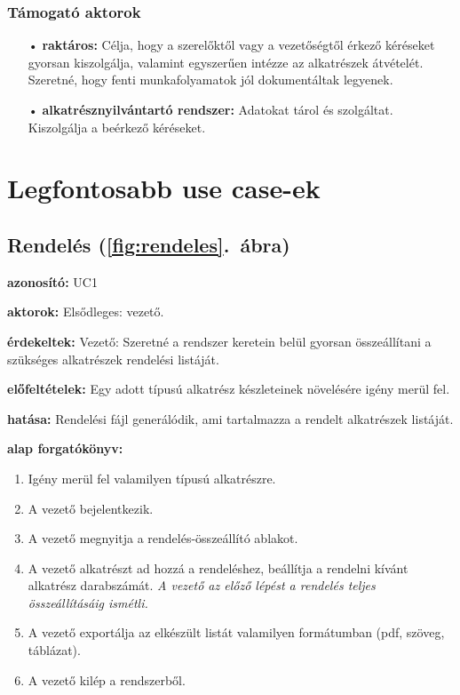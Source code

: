 \documentclass[12pt]{article}\usepackage[left=20mm,right=20mm,top=14mm,bottom=20mm]{geometry}
\begin{document}
\subsubsection{Támogató aktorok}
\begin{itemize}
\item[•] \textbf{raktáros: } Célja, hogy a szerelőktől vagy a vezetőségtől érkező kéréseket gyorsan kiszolgálja, valamint egyszerűen intézze az alkatrészek átvételét.
Szeretné, hogy fenti munkafolyamatok jól dokumentáltak legyenek.

\item[•] \textbf{alkatrésznyilvántartó rendszer: } Adatokat tárol és szolgáltat. Kiszolgálja a beérkező kéréseket.
\end{itemize}

\section{Legfontosabb use case-ek}
\subsection{Rendelés (\ref{fig:rendeles}.~ábra)}
\noindent\textbf{azonosító: } UC1
\vspace{4mm}

\noindent\textbf{aktorok: } Elsődleges: vezető.  
\vspace{4mm}

\noindent\textbf{érdekeltek: } Vezető: Szeretné a rendszer keretein belül gyorsan összeállítani a szükséges alkatrészek rendelési listáját.
\vspace{4mm}

\noindent\textbf{előfeltételek: } Egy adott típusú alkatrész készleteinek növelésére igény merül fel.
\vspace{4mm}

\noindent\textbf{hatása: } Rendelési fájl generálódik, ami tartalmazza a rendelt alkatrészek listáját.
\vspace{4mm}

\noindent\textbf{alap forgatókönyv: }
\begin{enumerate}
\item Igény merül fel valamilyen típusú alkatrészre.
\item A vezető bejelentkezik.
\item A vezető megnyitja a rendelés-összeállító ablakot.
\item A vezető alkatrészt ad hozzá a rendeléshez, beállítja a rendelni kívánt alkatrész darabszámát.
\textit{A vezető az előző lépést a rendelés teljes összeállításáig ismétli.}
\item A vezető exportálja az elkészült listát valamilyen formátumban (pdf, szöveg, táblázat).
\item A vezető kilép a rendszerből.
\end{enumerate}
\vspace{4mm}
\end{document}
